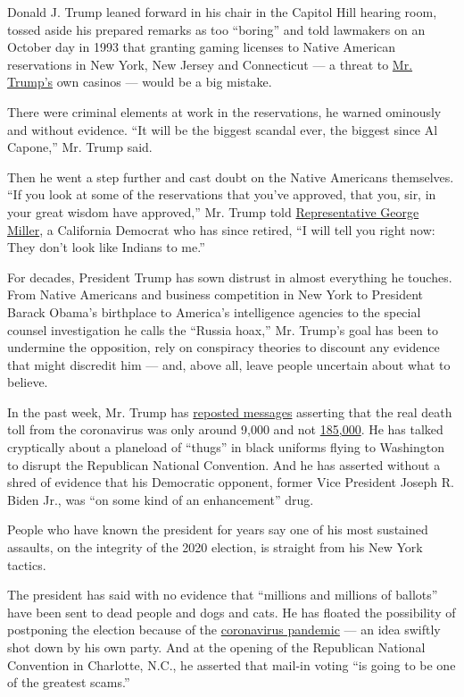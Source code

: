 Donald J. Trump leaned forward in his chair in the Capitol Hill hearing
room, tossed aside his prepared remarks as too ``boring'' and told
lawmakers on an October day in 1993 that granting gaming licenses to
Native American reservations in New York, New Jersey and Connecticut ---
a threat to
\href{https://www.nytimes3xbfgragh.onion/2020/09/04/us/politics/biden-trump-soliders-insults.html}{Mr.
Trump's} own casinos --- would be a big mistake.

There were criminal elements at work in the reservations, he warned
ominously and without evidence. ``It will be the biggest scandal ever,
the biggest since Al Capone,'' Mr. Trump said.

Then he went a step further and cast doubt on the Native Americans
themselves. ``If you look at some of the reservations that you've
approved, that you, sir, in your great wisdom have approved,'' Mr. Trump
told
\href{https://www.nytimes3xbfgragh.onion/2014/01/14/us/politics/another-house-democrat-is-set-to-retire.html}{Representative
George Miller}, a California Democrat who has since retired, ``I will
tell you right now: They don't look like Indians to me.''

For decades, President Trump has sown distrust in almost everything he
touches. From Native Americans and business competition in New York to
President Barack Obama's birthplace to America's intelligence agencies
to the special counsel investigation he calls the ``Russia hoax,'' Mr.
Trump's goal has been to undermine the opposition, rely on conspiracy
theories to discount any evidence that might discredit him --- and,
above all, leave people uncertain about what to believe.

In the past week, Mr. Trump has
\href{https://twitter.com/littllemel/status/1299791452105474057}{reposted
messages} asserting that the real death toll from the coronavirus was
only around 9,000 and not
\href{https://www.nytimes3xbfgragh.onion/interactive/2020/us/coronavirus-us-cases.html}{185,000}.
He has talked cryptically about a planeload of ``thugs'' in black
uniforms flying to Washington to disrupt the Republican National
Convention. And he has asserted without a shred of evidence that his
Democratic opponent, former Vice President Joseph R. Biden Jr., was ``on
some kind of an enhancement'' drug.

People who have known the president for years say one of his most
sustained assaults, on the integrity of the 2020 election, is straight
from his New York tactics.

The president has said with no evidence that ``millions and millions of
ballots'' have been sent to dead people and dogs and cats. He has
floated the possibility of postponing the election because of the
\href{https://www.nytimes3xbfgragh.onion/interactive/2020/us/coronavirus-us-cases.html}{coronavirus
pandemic} --- an idea swiftly shot down by his own party. And at the
opening of the Republican National Convention in Charlotte, N.C., he
asserted that mail-in voting ``is going to be one of the greatest
scams.''

